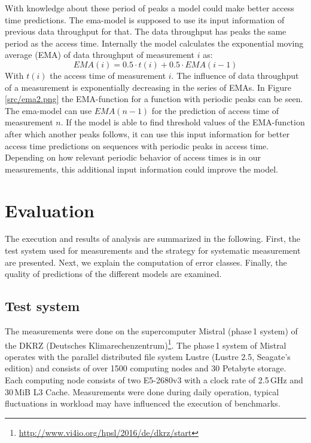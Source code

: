 \documentclass{superfri}
\begin{document}
With knowledge about these period of peaks a model could make better access time predictions.
The ema-model is supposed to use its input information of previous data throughput for that.
The data throughput has peaks the same period as the access time.
Internally the model calculates the exponential moving average (EMA) of data throughput of measurement $i$ as:
\begin{equation}
EMA(i) = 0.5 \cdot t(i)+ 0.5 \cdot EMA(i-1)
\end{equation}
With $t(i)$ the access time of measurement $i$.
The influence of data throughput of a measurement is exponentially decreasing in the series of EMAs.
In Figure \ref{src/ema2.png} the EMA-function for a function with periodic peaks can be seen.
\\
The ema-model can use $EMA(n-1)$ for the prediction of access time of measurement $n$.
If the model is able to find threshold values of the EMA-function after which another peaks follows, it can use this input information for better access time predictions on sequences with periodic peaks in access time. Depending on how relevant periodic behavior of access times is in our measurements, this additional input information could improve the model.\medskip

\section{Evaluation}
\label{evaluation}
The execution and results of analysis are summarized in the following.
First, the test system used for measurements and the strategy for systematic measurement are presented.
Next, we explain the computation of error classes.
Finally, the quality of predictions of the different models are examined.

\subsection{Test system}
The measurements were done on the supercomputer Mistral (phase\,1 system) of the DKRZ (Deutsches Klimarechenzentrum)\footnote{\url{http://www.vi4io.org/hpsl/2016/de/dkrz/start}}.
The phase\,1 system of Mistral operates with the parallel distributed file system Lustre (Lustre 2.5, Seagate's edition) and consists of over 1500 computing nodes and 30 Petabyte storage.
Each computing node consists of two E5-2680v3 with a clock rate of 2.5\,GHz and 30\,MiB L3 Cache.
Measurements were done during daily operation, typical fluctuations in workload may have influenced the execution of benchmarks.
\end{document}
